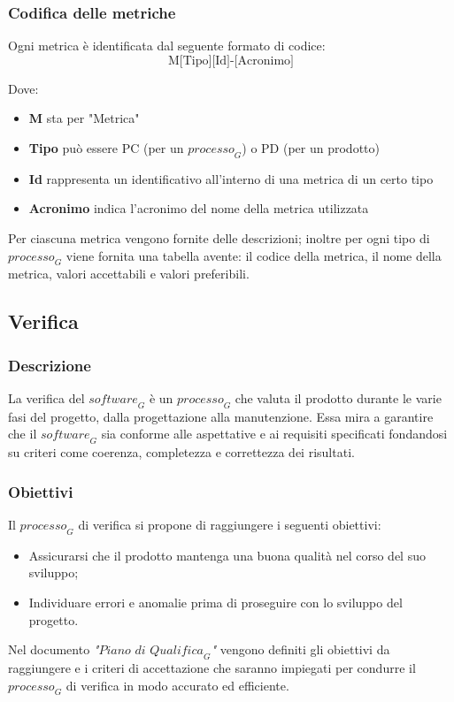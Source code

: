\subsubsection{Codifica delle metriche}
Ogni metrica è identificata dal seguente formato di codice:
\[
\text{M[Tipo][Id]-[Acronimo]}
\]

Dove:
\begin{itemize}
    \item \textbf{M} sta per "Metrica"
    \item \textbf{Tipo} può essere PC (per un $\textit{processo}_G$) o PD (per un prodotto)
    \item \textbf{Id} rappresenta un identificativo all'interno di una metrica di un certo tipo
    \item \textbf{Acronimo} indica l'acronimo del nome della metrica utilizzata
\end{itemize}
Per ciascuna metrica vengono fornite delle descrizioni; inoltre per ogni tipo di $\textit{processo}_G$ viene fornita una tabella avente: il codice della metrica, il nome della metrica, valori accettabili e valori preferibili.

\subsection{Verifica}
\subsubsection{Descrizione}
La verifica del $\textit{software}_G$ è un $\textit{processo}_G$ che valuta il prodotto durante le varie fasi del progetto, dalla progettazione alla manutenzione. Essa mira a garantire che il $\textit{software}_G$ sia conforme alle aspettative e ai requisiti specificati fondandosi su criteri come coerenza, completezza e correttezza dei risultati.
\subsubsection{Obiettivi}
Il $\textit{processo}_G$ di verifica si propone di raggiungere i seguenti obiettivi:
\begin{itemize}
    \item Assicurarsi che il prodotto mantenga una buona qualità nel corso del suo sviluppo;
    \item Individuare errori e anomalie prima di proseguire con lo sviluppo del progetto.
\end{itemize}
Nel documento \emph{"$\textit{Piano di Qualifica}_G$"} vengono definiti gli obiettivi da raggiungere e i criteri di accettazione  che saranno impiegati per condurre il $\textit{processo}_G$ di verifica in modo accurato ed efficiente. 
